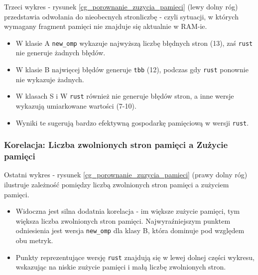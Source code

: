 Trzeci wykres - rysunek \ref{cg_porownanie_zuzycia_pamieci} (lewy dolny róg) przedstawia odwołania do nieobecnych stronliczbę  - czyli sytuacji, w których wymagany fragment pamięci nie znajduje się aktualnie w RAM-ie.
\begin{itemize}
    \item W klasie A \texttt{new\_omp} wykazuje najwyższą liczbę błędnych stron (13), zaś \texttt{rust} nie generuje żadnych błędów.
    \item W klasie B najwięcej błędów generuje \texttt{tbb} (12), podczas gdy \texttt{rust} ponownie nie wykazuje żadnych.
    \item W klasach S i W \texttt{rust} również nie generuje błędów stron, a inne wersje wykazują umiarkowane wartości (7-10).
    \item Wyniki te sugerują bardzo efektywną gospodarkę pamięciową w wersji \texttt{rust}.
\end{itemize}

\subsubsection{Korelacja: Liczba zwolnionych stron pamięci a Zużycie pamięci}
Ostatni wykres - rysunek \ref{cg_porownanie_zuzycia_pamieci} (prawy dolny róg) ilustruje zależność pomiędzy liczbą zwolnionych stron pamięci a zużyciem pamięci.
\begin{itemize}
    \item Widoczna jest silna dodatnia korelacja - im większe zużycie pamięci, tym większa liczba zwolnionych stron pamięci. Najwyraźniejszym punktem odniesienia jest wersja \texttt{new\_omp} dla klasy B, która dominuje pod względem obu metryk.
    \item Punkty reprezentujące wersję \texttt{rust} znajdują się w lewej dolnej części wykresu, wskazując na niskie zużycie pamięci i małą liczbę zwolnionych stron.
\end{itemize}

